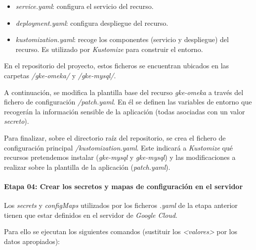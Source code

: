 \begin{itemize}
\tightlist
\item
  \emph{service.yaml}: configura el servicio del recurso.
\item
  \emph{deployment.yaml}: configura despliegue del recurso.
\item
  \emph{kustomization.yaml}: recoge los componentes (servicio y
  despliegue) del recurso. Es utilizado por \emph{Kustomize} para
  construir el entorno.
\end{itemize}

En el repositorio del proyecto, estos ficheros se encuentran ubicados en
las carpetas \emph{/gke-omeka/} y \emph{/gke-mysql/}.

A continuación, se modifica la plantilla base del recurso
\emph{gke-omeka} a través del fichero de configuración
\emph{/patch.yaml}. En él se definen las variables de entorno que recogerán 
la información sensible de la aplicación (todas asociadas con un valor \emph{secreto}).

Para finalizar, sobre el directorio raíz del repositorio, se crea el
fichero de configuración principal \emph{/kustomization.yaml}. Este
indicará a \emph{Kustomize} qué recursos pretendemos instalar
(\emph{gke-mysql} y \emph{gke-mysql}) y las modificaciones a realizar
sobre la plantilla de la aplicación (\emph{patch.yaml}).


\paragraph{Etapa 04: Crear los secretos y mapas de configuración en el servidor}

Los \emph{secrets} y \emph{configMaps} utilizados por los ficheros \emph{.yaml} de la etapa
anterior tienen que estar definidos en el servidor de \emph{Google Cloud}.

Para ello se ejecutan los siguientes comandos (sustituir los \emph{<valores>} por los datos apropiados):

